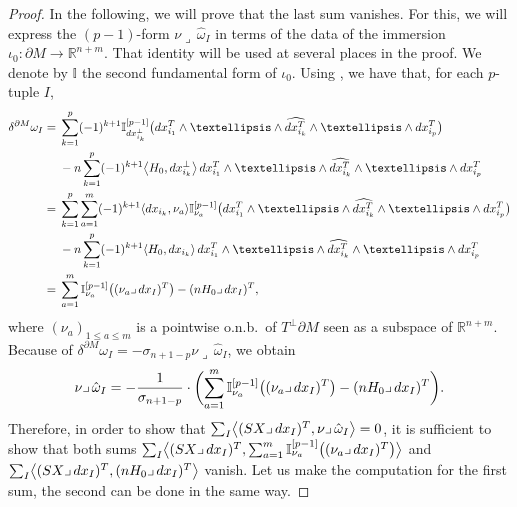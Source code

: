 \documentclass[11pt]{article}
\numberwithin{equation}{section}
\numberwithin{equation}{section}
\begin{document}
\begin{proof}
In the following, we will prove that the last sum vanishes.
For this, we will express the $(p-1)$-form $\nu\lrcorner\,\hat{\omega}_I$  in terms of the data of the immersion $\iota_0\colon\partial M\to\mathbb{R}^{n+m}$. That identity will be used at several places in the proof. We denote by $\mathbb{I}$ the second fundamental form of $\iota_0$. Using \cite[equation~(3.3)]{Savo05}, we have that, for each $p$-tuple $I$,
\begin{align}
\delta^{\partial M}\omega_I={} &\sum_{k=1}^p(-1)^{k+1}\mathbb{I}_{{\rm d}x_{i_k}^\perp}^{[p-1]}\bigl({\rm d}x_{i_1}^T\wedge \dots \wedge\widehat{{\rm d}x_{i_k}^T}\wedge\dots \wedge {\rm d}x_{i_p}^T\bigr)\nonumber\\
&{}-n \sum_{k=1}^p(-1)^{k+1}\bigl\langle H_0, {\rm d}x_{i_k}^\perp\bigr\rangle\,{\rm d}x_{i_1}^T\wedge\dots\wedge\widehat{{\rm d}x_{i_k}^T}\wedge\dots \wedge {\rm d}x_{i_p}^T\nonumber\\
 ={} &\sum_{k=1}^p\sum_{a=1}^m(-1)^{k+1}\langle {\rm d}x_{i_k},\nu_a\rangle\mathbb{I}_{\nu_a}^{[p-1]}\bigl({\rm d}x_{i_1}^T\wedge \dots \wedge\widehat{{\rm d}x_{i_k}^T}\wedge\dots \wedge {\rm d}x_{i_p}^T\bigr)\nonumber\\
 &{}-n \sum_{k=1}^p(-1)^{k+1}\langle H_0, {\rm d}x_{i_k}\rangle\,{\rm d}x_{i_1}^T\wedge\dots\wedge\widehat{{\rm d}x_{i_k}^T}\wedge\dots \wedge {\rm d}x_{i_p}^T\nonumber\\
 ={}&\sum_{a=1}^m\mathbb{I}_{\nu_a}^{[p-1]}\bigl((\nu_a\lrcorner\,{\rm d}x_I)^T\bigr)-(nH_0\lrcorner\,{\rm d}x_I)^T,\label{eq:deltaomegaISavo}
\end{align}
where $(\nu_a)_{1\leq a\leq m}$ is a pointwise o.n.b.\ of $T^\perp \partial M$ seen as a subspace of $\mathbb{R}^{n+m}$. Because of $\delta^{\partial M}\omega_I=-\sigma_{n+1-p}\nu\lrcorner\,\hat{\omega}_I$, we obtain
\begin{equation}\label{eq:nuinterioromega}
\nu\lrcorner\,\hat{\omega}_I=-\frac{1}{\sigma_{n+1-p}}\cdot\biggl(\sum_{a=1}^m\mathbb{I}_{\nu_a}^{[p-1]}\bigl((\nu_a\lrcorner\,{\rm d}x_I)^T\bigr)-(nH_0\lrcorner\,{\rm d}x_I)^T\biggr).
\end{equation}
Therefore, in order to show that $\sum_I\bigl\langle (SX\lrcorner\,{\rm d}x_I)^T,\nu\lrcorner\,\hat{\omega}_I\bigr\rangle=0$, it is sufficient to show that both sums $\sum_I\bigl\langle (SX\lrcorner\,{\rm d}x_I)^T,\sum_{a=1}^m\mathbb{I}_{\nu_a}^{[p-1]}\bigl((\nu_a\lrcorner\,{\rm d}x_I)^T\bigr)\bigr\rangle$ and $\sum_I\bigl\langle (SX\lrcorner\,{\rm d}x_I)^T,(nH_0\lrcorner\,{\rm d}x_I)^T\bigr\rangle$ vanish.
Let us make the computation for the first sum, the second can be done in the same way.

\end{proof}
\end{document}
